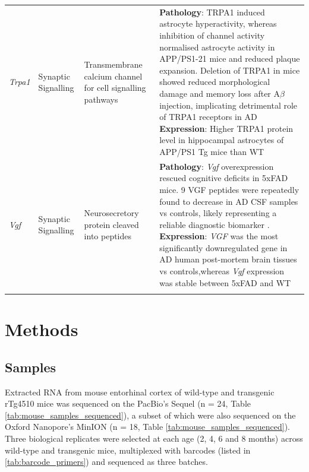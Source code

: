 \begin{changemargin}{1.5cm}
\begin{landscape}
\begin{longtable}[c]{p{1cm}p{2cm}p{4cm}p{19cm}}
			\centering \textit{Trpa1} &
			\centering Synaptic Signalling  &
			\centering Transmembrane calcium channel for cell signalling pathways\newline &
			\tabitem \textbf{Pathology}: TRPA1 induced astrocyte hyperactivity, whereas inhibition of channel activity normalised astrocyte activity in APP/PS1-21 mice and reduced plaque expansion\cite{Lee2016a}. Deletion of TRPA1 in mice showed reduced morphological damage and memory loss after A$\beta$ injection, implicating detrimental role of TRPA1 receptors in AD\cite{Payrits2020} \newline
			\tabitem \textbf{Expression}: Higher TRPA1 protein level in hippocampal astrocytes of APP/PS1 Tg mice than WT\cite{Lee2016a} \\
			\hdashline[0.5pt/5pt]	
			
			\centering \textit{Vgf} &
			\centering Synaptic Signalling  &
			\centering Neurosecretory protein cleaved into peptides \newline &
			\tabitem \textbf{Pathology}: \textit{Vgf} overexpression rescued cognitive deficits in 5xFAD mice\cite{Bai2020}. 9 VGF peptides were repeatedly found to decrease in AD CSF samples vs controls, likely representing a reliable diagnostic biomarker \cite{VanSteenoven2019}. \newline
			\tabitem \textbf{Expression}: \textit{VGF} was the most significantly downregulated gene in AD human post-mortem brain tissues vs controls\cite{Beckmann2020},whereas \textit{Vgf} expression was stable between 5xFAD and WT\cite{Bai2020} \\
			\hdashline[0.5pt/5pt]		
			
			\centering  &
			\centering &
			\centering  &
			\tabitem \\* \bottomrule
		\end{longtable}
	\end{landscape}
\end{changemargin}


 

\section{Methods}

\subsection{Samples}
Extracted RNA from mouse entorhinal cortex of wild-type and transgenic rTg4510 mice was sequenced on the PacBio's Sequel (n = 24, Table \ref{tab:mouse_samples_sequenced}), a subset of which were also sequenced on the Oxford Nanopore's MinION (n = 18, Table \ref{tab:mouse_samples_sequenced}). Three biological replicates were selected at each age (2, 4, 6 and 8 months) across wild-type and transgenic mice, multiplexed with barcodes (listed in \cref{tab:barcode_primers}) and sequenced as three batches.

